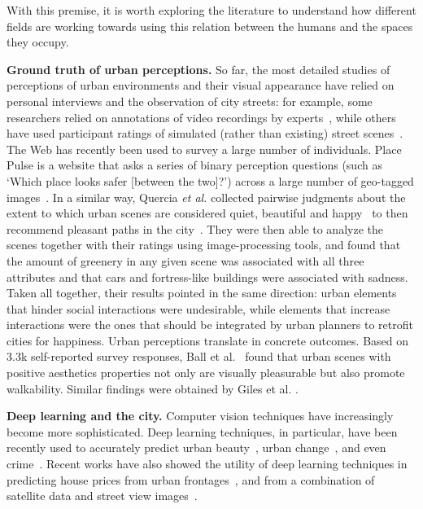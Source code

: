 With this premise, it is worth exploring the literature to understand how different fields are working towards using this relation between the humans and the spaces they occupy.
\vspace{10pt}\noindent


\textbf{Ground truth of urban perceptions.} So far, the most detailed studies of perceptions of urban environments and their visual appearance have relied on personal interviews and the observation of city streets: for example, some researchers relied on annotations of video recordings by experts~\cite{sampson04seeing}, while others have used participant ratings of simulated (rather than existing) street scenes~\cite{lindal2012}. The Web has recently been used to survey a large number of individuals. Place Pulse is a website that asks a series of binary perception questions (such as `Which place looks safer [between the two]?') across a large number of geo-tagged images~\cite{salesses2013collaborative}. In a similar way, Quercia \emph{et al.} collected pairwise judgments about the extent to which urban scenes are considered quiet, beautiful and happy~\cite{quercia2014aesthetic} to then recommend pleasant paths in the city~\cite{quercia2014shortest}. They were then able to analyze the scenes together with their ratings using image-processing tools, and found that the amount of greenery in any given scene was associated with all three attributes and that cars and fortress-like buildings were associated with sadness. Taken all together, their results pointed in the same direction: urban elements that hinder social interactions were undesirable, while elements that increase interactions were the ones that should be integrated by urban planners to retrofit cities for happiness. Urban perceptions translate in concrete outcomes. Based on 3.3k self-reported survey responses,  Ball et al.~\cite{ball2001perceived} found that urban scenes with positive aesthetics properties  not only are visually  pleasurable but also promote walkability. Similar findings were obtained by Giles et al. \cite{giles2005increasing}.



\vspace{10pt}\noindent
\textbf{Deep learning and the city.} Computer vision techniques have increasingly become more sophisticated. Deep learning techniques, in particular, have been recently used to accurately predict urban beauty~\cite{dubey2016deep,seresinhe2017using}, urban change~\cite{naik2017computer}, and even crime~\cite{DeNadai16,arietta2014city}.  Recent works have also showed the utility of deep learning techniques in predicting house prices from urban frontages~\cite{frontage}, and from a combination of satellite data and street view images~\cite{law2018take}.

